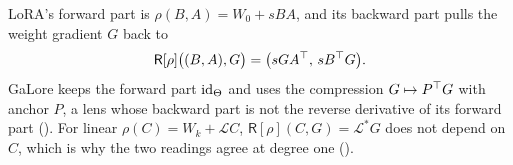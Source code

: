 LoRA's forward part is $\rho(B,A)=W_0+sBA$, and its backward part pulls the weight gradient $G$ back to
\begin{equation*}
  \mathsf R[\rho]\big((B,A),G\big)=\big(sGA^{\top},\,sB^{\top} G\big).
\end{equation*}
GaLore \citep{zhao2024galore} keeps the forward part $\mathrm{id}_\Theta$ and uses the compression $G\mapsto P^{\top} G$ with anchor
$P$, a lens whose backward part is not the reverse derivative of its forward part (). For linear
$\rho(C)=W_k+\mathcal LC$, $\mathsf R[\rho](C,G)=\mathcal L^*G$ does not depend on $C$, which is why the two readings
agree at degree one ().

